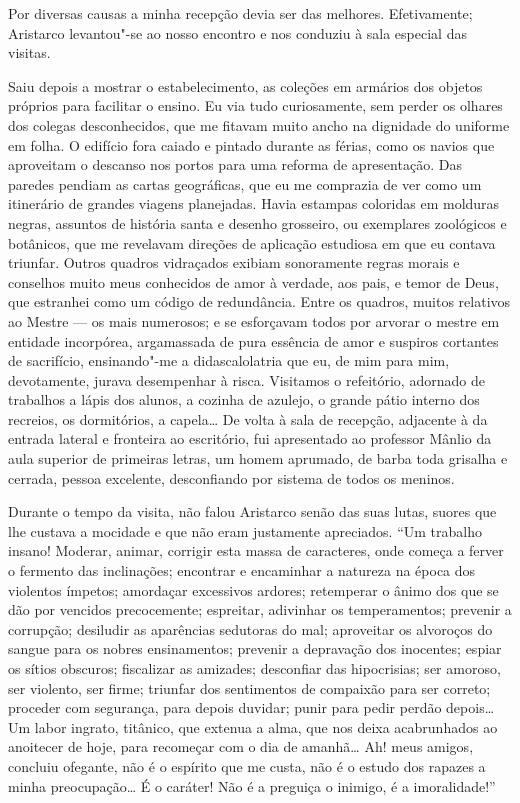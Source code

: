 Por diversas causas a minha recepção devia ser das melhores.
Efetivamente; Aristarco levantou"-se ao nosso encontro e nos conduziu
à sala especial das visitas. 

Saiu depois a mostrar o estabelecimento,
as coleções em armários dos objetos próprios para facilitar o ensino.
Eu via tudo curiosamente, sem perder os olhares dos colegas
desconhecidos, que me fitavam muito ancho na dignidade do uniforme em
folha. O edifício fora caiado e pintado durante as férias, como os
navios que aproveitam o descanso nos portos para uma reforma de
apresentação. Das paredes pendiam as cartas geográficas, que eu me
comprazia de ver como um itinerário de grandes viagens planejadas.
Havia estampas coloridas em molduras negras, assuntos de história santa
e desenho grosseiro, ou exemplares zoológicos e botânicos, que me
revelavam direções de aplicação estudiosa em que eu contava triunfar.
Outros quadros vidraçados exibiam sonoramente regras morais e conselhos
muito meus conhecidos de amor à verdade, aos pais, e temor de Deus, que
estranhei como um código de redundância. Entre os quadros, muitos relativos ao
Mestre --- os mais numerosos; e se esforçavam todos por arvorar o mestre
em entidade incorpórea, argamassada de pura essência de amor e suspiros
cortantes de sacrifício, ensinando"-me a didascalolatria que eu, de
mim para mim, devotamente, jurava desempenhar à risca. Visitamos o
refeitório, adornado de trabalhos a lápis dos alunos, a cozinha de
azulejo, o grande pátio interno dos recreios, os dormitórios, a
capela\ldots{} De volta à sala de recepção, adjacente à da entrada lateral e
fronteira ao escritório, fui apresentado ao professor Mânlio da aula
superior de primeiras letras, um homem aprumado, de barba toda grisalha
e cerrada, pessoa excelente, desconfiando por sistema de todos os
meninos. 

Durante o tempo da visita, não falou Aristarco senão das suas
lutas, suores que lhe custava a mocidade e que não eram justamente
apreciados. ``Um trabalho insano! Moderar, animar, corrigir esta massa
de caracteres, onde começa a ferver o fermento das inclinações;
encontrar e encaminhar a natureza na época dos violentos ímpetos;
amordaçar excessivos ardores; retemperar o ânimo dos que se dão por
vencidos precocemente; espreitar, adivinhar os temperamentos; prevenir
a corrupção; desiludir as aparências sedutoras do mal; aproveitar os
alvoroços do sangue para os nobres ensinamentos; prevenir a depravação
dos inocentes; espiar os sítios obscuros; fiscalizar as amizades;
desconfiar das hipocrisias; ser amoroso, ser violento, ser firme;
triunfar dos sentimentos de compaixão para ser correto; proceder com
segurança, para depois duvidar; punir para pedir perdão depois\ldots{} Um
labor ingrato, titânico, que extenua a alma, que nos deixa acabrunhados
ao anoitecer de hoje, para recomeçar com o dia de amanhã\ldots{} Ah! meus
amigos, concluiu ofegante, não é o espírito que me custa, não é o
estudo dos rapazes a minha preocupação\ldots{} É o caráter! Não é a preguiça
o inimigo, é a imoralidade!'' 

